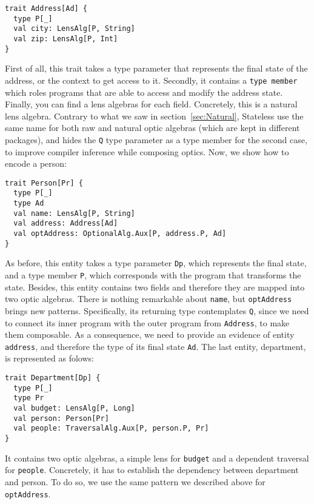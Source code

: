\documentclass[final, twocolumn, 3p]{elsarticle}
\begin{document}
\begin{lstlisting}
trait Address[Ad] {
  type P[_]
  val city: LensAlg[P, String]
  val zip: LensAlg[P, Int]
}
\end{lstlisting}

First of all, this trait takes a type parameter that represents the final state
of the address, or the context to get access to it. Secondly, it contains a
\lstinline{type member} which roles programs that are able to access and modify
the address state. Finally, you can find a lens algebras for each field.
Concretely, this is a natural lens algebra. Contrary to what we saw in
section~\ref{sec:Natural}, Stateless use the same name for both raw and natural
optic algebras (which are kept in different packages), and hides the
\lstinline{Q} type parameter as a type member for the second case, to improve
compiler inference while composing optics. Now, we show how to encode a person:

\begin{lstlisting}
trait Person[Pr] {
  type P[_]
  type Ad
  val name: LensAlg[P, String]
  val address: Address[Ad]
  val optAddress: OptionalAlg.Aux[P, address.P, Ad]
}
\end{lstlisting}

As before, this entity takes a type parameter \lstinline{Dp}, which represents
the final state, and a type member \lstinline{P}, which corresponds with the
program that transforms the state. Besides, this entity contains two fields and
therefore they are mapped into two optic algebras. There is nothing remarkable
about \lstinline{name}, but \lstinline{optAddress} brings new patterns.
Specifically, its returning type contemplates \lstinline{Q}, since we need to
connect its inner program with the outer program from \lstinline{Address}, to
make them composable. As a consequence, we need to provide an evidence of entity
\lstinline{address}, and therefore the type of its final state \lstinline{Ad}.
The last entity, department, is represented as folows:

\begin{lstlisting}
trait Department[Dp] {
  type P[_]
  type Pr
  val budget: LensAlg[P, Long]
  val person: Person[Pr]
  val people: TraversalAlg.Aux[P, person.P, Pr]
}
\end{lstlisting}

It contains two optic algebras, a simple lens for \lstinline{budget} and a
dependent traversal for \lstinline{people}. Concretely, it has to establish the
dependency between department and person. To do so, we use the same pattern we
described above for \lstinline{optAddress}.
\end{document}
